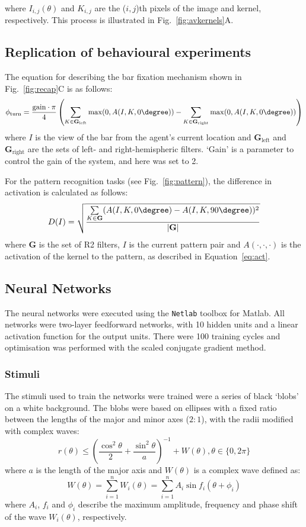 where $I_{i,j}(\theta)$ and $K_{i,j}$ are the ($i,j$)th pixels of the image and kernel, respectively. This process is illustrated in Fig.~\ref{fig:avkernels}A.

\subsection{Replication of behavioural experiments}
The equation for describing the bar fixation mechanism shown in Fig.~\ref{fig:recap}C is as follows:
$$
\phi_\mathrm{turn} = \frac{\mathrm{gain}\cdot \pi}{4}\left( \sum\limits_{K\in \mathbf{G}_\mathrm{left}}\max(0,A(I,K,0\degree)) - \sum\limits_{K\in \mathbf{G}_\mathrm{right}}\max(0,A(I,K,0\degree)) \right)
$$
where $I$ is the view of the bar from the agent's current location and $\mathbf{G}_\mathrm{left}$ and $\mathbf{G}_\mathrm{right}$ are the sets of left- and right-hemispheric filters. `Gain' is a parameter to control the gain of the system, and here was set to 2.

For the pattern recognition tasks (see Fig.~\ref{fig:pattern}), the difference in activation is calculated as follows:
$$
D(I) = \sqrt{\frac{\sum\limits_{K\in \mathbf{G}}(A(I,K,0\degree)-A(I,K,90\degree))^2}{|\mathbf{G}|}}
$$
where $\mathbf{G}$ is the set of R2 filters, $I$ is the current pattern pair and $A(\cdot,\cdot,\cdot)$ is the activation of the kernel to the pattern, as described in Equation~\ref{eq:act}.

\subsection{Neural Networks}
The neural networks were executed using the \texttt{Netlab} toolbox for Matlab.
All networks were two-layer feedforward networks, with 10 hidden units and a linear activation function for the output units.
There were 100 training cycles and optimisation was performed with the scaled conjugate gradient method.

\subsubsection{Stimuli}
\label{sec:methods:stimuli}
The stimuli used to train the networks were trained were a series of black `blobs' on a white background.
The blobs were based on ellipses with a fixed ratio between the lengths of the major and minor axes ($2:1$), with the radii modified with complex waves:
$$
r(\theta) \le \left(\frac{\cos^2 \theta}{2} + \frac{\sin^2 \theta}{a} \right)^{-1} + W(\theta), \theta \in \{0, 2\pi\}
$$
where $a$ is the length of the major axis and $W(\theta)$ is a complex wave defined as:
$$
W(\theta) = \sum_{i=1}^n W_i(\theta) = \sum_{i=1}^n A_i \sin f_i (\theta+\phi_i) 
$$
where $A_i$, $f_i$ and $\phi_i$ describe the maximum amplitude, frequency and phase shift of the wave $W_i(\theta)$, respectively.

